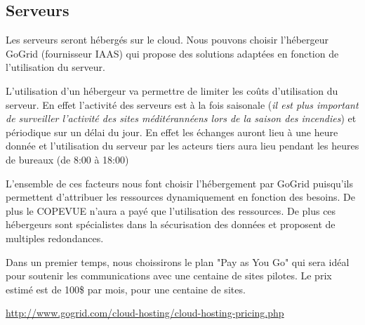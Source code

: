 \subsection{Serveurs}

Les serveurs seront hébergés sur le cloud. Nous pouvons choisir l'hébergeur 
GoGrid (fournisseur IAAS) qui propose des solutions adaptées en fonction de 
l'utilisation du serveur.

L'utilisation d'un hébergeur va permettre de limiter les coûts
d'utilisation du serveur.  En effet l'activité des serveurs est à la fois
saisonale 
(\textit{il est plus important de surveiller l'activité des sites méditérannéens lors de la saison des incendies}) et
périodique sur un délai du jour. En effet les échanges auront lieu à une
heure donnée et l'utilisation du serveur par les acteurs tiers aura lieu
pendant les heures de bureaux (de 8:00 à 18:00)

L'ensemble de ces facteurs nous font choisir l'hébergement par GoGrid
puisqu'ils permettent d'attribuer les ressources dynamiquement en fonction
des besoins. De plus le COPEVUE n'aura a payé que l'utilisation des
ressources. De plus ces hébergeurs sont spécialistes dans la sécurisation
des données et proposent de multiples redondances. 

Dans un premier temps, nous choissirons le plan "Pay as You Go" qui sera
idéal pour soutenir les communications avec une centaine de sites pilotes.
Le prix estimé est de 100\$ par mois, pour une centaine de sites.

\url{http://www.gogrid.com/cloud-hosting/cloud-hosting-pricing.php}

